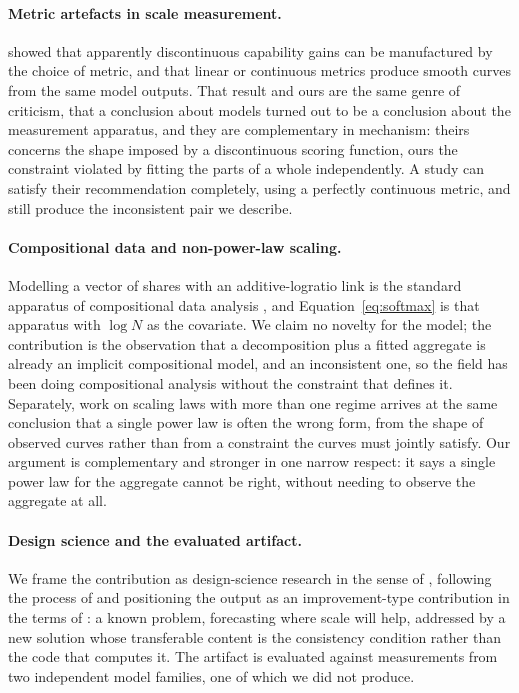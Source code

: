 \documentclass[11pt]{article}
\begin{document}
\paragraph{Metric artefacts in scale measurement.}
\citet{schaeffer2023emergent} showed that apparently discontinuous capability gains
can be manufactured by the choice of metric, and that linear or continuous metrics
produce smooth curves from the same model outputs. That result and ours are the
same genre of criticism, that a conclusion about models turned out to be a
conclusion about the measurement apparatus, and they are complementary in
mechanism: theirs concerns the shape imposed by a discontinuous scoring function,
ours the constraint violated by fitting the parts of a whole independently. A study
can satisfy their recommendation completely, using a perfectly continuous metric,
and still produce the inconsistent pair we describe.

\paragraph{Compositional data and non-power-law scaling.}
Modelling a vector of shares with an additive-logratio link is the standard
apparatus of compositional data analysis \citep{aitchison1986statistical}, and
Equation~\ref{eq:softmax} is that apparatus with $\log N$ as the covariate. We claim
no novelty for the model; the contribution is the observation that a decomposition
plus a fitted aggregate is already an implicit compositional model, and an
inconsistent one, so the field has been doing compositional analysis without the
constraint that defines it. Separately, work on scaling laws with more than one
regime \citep{caballero2023broken} arrives at the same conclusion that a single
power law is often the wrong form, from the shape of observed curves rather than
from a constraint the curves must jointly satisfy. Our argument is complementary and
stronger in one narrow respect: it says a single power law for the aggregate cannot
be right, without needing to observe the aggregate at all.

\paragraph{Design science and the evaluated artifact.}
We frame the contribution as design-science research in the sense of
\citet{hevner2004design}, following the process of \citet{peffers2007design} and
positioning the output as an improvement-type contribution in the terms of
\citet{gregor2013positioning}: a known problem, forecasting where scale will help,
addressed by a new solution whose transferable content is the consistency
condition rather than the code that computes it. The artifact is evaluated against
measurements from two independent model families, one of which we did not produce.
\end{document}
